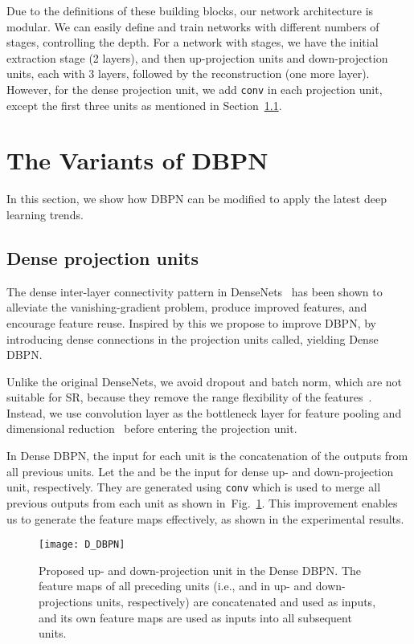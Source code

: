 \documentclass[10pt,journal,compsoc]{IEEEtran}
\begin{document}
Due to the definitions of these building blocks, our network
architecture is modular. We can easily define and train networks with
different numbers of stages, controlling the depth. For a network with
 stages, we have the initial extraction stage (2 layers), and then
 up-projection units and  down-projection units, each with 3
layers, followed by the reconstruction (one more layer). 
However, for the dense projection unit, we add \texttt{conv} in each projection unit, except the first three units as mentioned in Section~\ref{subsec:dense_projection_unit}. \section{The Variants of DBPN}
\label{sec:variant}
In this section, we show how DBPN can be modified to apply the latest deep learning trends. 

\subsection{Dense projection units}
\label{subsec:dense_projection_unit}
The dense inter-layer connectivity pattern in DenseNets~\cite{huang2017densely} has been shown to 
alleviate the vanishing-gradient problem, produce improved features,
and encourage feature reuse. Inspired by this we propose to improve
DBPN, by introducing dense connections in the projection units called,
yielding Dense DBPN.

Unlike the original DenseNets, we avoid dropout and batch norm, which are not suitable for SR, because they remove the range flexibility of the features~\cite{Lim_2017_CVPR_Workshops}.
Instead, we use  convolution layer as the bottleneck layer for feature pooling and dimensional reduction~\cite{szegedy2015going,Haris17} before entering the projection unit.


In Dense DBPN, the input for each unit is the concatenation of the outputs from all previous units. Let the  and  be the input for dense up- and down-projection unit, respectively. They are generated using \texttt{conv} which is used to merge all previous outputs from each unit as shown in~Fig.~\ref{figure:D_DBPN}. This improvement enables us to generate the feature maps effectively, as shown in the experimental results.

\begin{figure}[t!]
\centering
\texttt{[image: D\_DBPN]}\vspace{-1em}
\caption{Proposed up- and down-projection unit in the Dense DBPN. The feature maps of all preceding units (i.e.,  and  in up- and down-projections units, respectively) are concatenated and used as inputs, and its own feature maps are used as inputs into all subsequent units.}
\label{figure:D_DBPN}
\end{figure}
\end{document}
